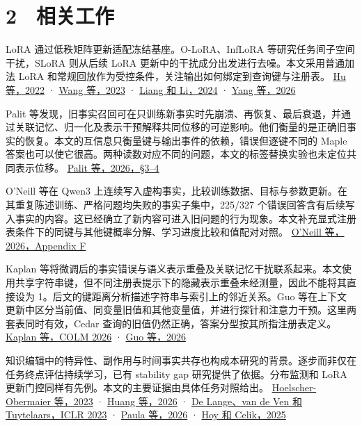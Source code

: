 \documentclass[UTF8,fontset=fandol,10pt,a4paper]{ctexart}
\begin{document}
\section*{2　相关工作}
LoRA 通过低秩矩阵更新适配冻结基座。O-LoRA、InfLoRA 等研究任务间子空间干扰，SLoRA 则从后续 LoRA 更新中的干扰成分出发进行去噪。本文采用普通加法 LoRA 和常规回放作为受控条件，关注输出如何绑定到查询键与注册表。 \href{https://arxiv.org/abs/2106.09685}{Hu 等，2022} · \href{https://aclanthology.org/2023.findings-emnlp.715/}{Wang 等，2023} · \href{https://arxiv.org/abs/2404.00228}{Liang 和 Li，2024} · \href{https://aclanthology.org/2026.acl-long.247/}{Yang 等，2026}



Palit 等发现，旧事实召回可在只训练新事实时先崩溃、再恢复、最后衰退，并通过关联记忆、归一化及表示干预解释共同位移的可逆影响。他们衡量的是正确旧事实的恢复。本文的互信息只衡量键与输出事件的依赖，错误但逐键不同的 Maple 答案也可以使它很高。两种读数对应不同的问题，本文的标签替换实验也未定位共同表示位移。 \href{https://arxiv.org/abs/2610.08718}{Palit 等，2026，§3–4}



O’Neill 等在 Qwen3 上连续写入虚构事实，比较训练数据、目标与参数更新。在其重复陈述训练、严格问题均失败的事实子集中，225/327 个错误回答含有后续写入事实的内容。这已经确立了新内容可进入旧问题的行为现象。本文补充显式注册表条件下的同键与其他键概率分解、学习进度比较和值配对对照。 \href{https://www.alphaxiv.org/abs/2607.11020.md}{O’Neill 等，2026，Appendix F}



Kaplan 等将微调后的事实错误与语义表示重叠及关联记忆干扰联系起来。本文使用共享字符串键，但不同注册表提示下的隐藏表示重叠未经测量，因此不能将其直接设为 1。后文的键距离分析描述字符串与索引上的邻近关系。Guo 等在上下文更新中区分当前值、同变量旧值和其他变量值，并进行探针和注意力干预。这里两套表同时有效，Cedar 查询的旧值仍然正确，答案分型按其所指注册表定义。 \href{https://arxiv.org/pdf/2604.15574}{Kaplan 等，COLM 2026} · \href{https://arxiv.org/pdf/2609.38866}{Guo 等，2026}



知识编辑中的特异性、副作用与时间事实共存也构成本研究的背景。逐步而非仅在任务终点评估持续学习，已有 stability gap 研究提供了依据。分布监测和 LoRA 更新门控同样有先例。本文的主要证据由具体任务对照给出。 \href{https://aclanthology.org/2023.findings-acl.733/}{Hoelscher-Obermaier 等，2023} · \href{https://aclanthology.org/2026.emnlp-main.1719/}{Huang 等，2026} · \href{https://arxiv.org/abs/2205.13452}{De Lange、van de Ven 和 Tuytelaars，ICLR 2023} · \href{https://arxiv.org/abs/2606.27634}{Paula 等，2026} · \href{https://arxiv.org/abs/2510.16089}{Hoy 和 Celik，2025}
\end{document}
